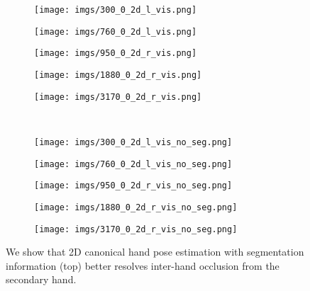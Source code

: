 \documentclass[10pt,twocolumn,letterpaper]{article}
\begin{document}
\begin{figure}[t]
  \centering
  \begin{subfigure}[t]{0.19\linewidth}
    \texttt{[image: imgs/300\_0\_2d\_l\_vis.png]}
  \end{subfigure}
  \begin{subfigure}[t]{0.19\linewidth}
    \texttt{[image: imgs/760\_0\_2d\_l\_vis.png]}
  \end{subfigure}
  \begin{subfigure}[t]{0.19\linewidth}
    \texttt{[image: imgs/950\_0\_2d\_r\_vis.png]}
  \end{subfigure}
  \begin{subfigure}[t]{0.19\linewidth}
    \texttt{[image: imgs/1880\_0\_2d\_r\_vis.png]}
  \end{subfigure}
  \begin{subfigure}[t]{0.19\linewidth}
    \texttt{[image: imgs/3170\_0\_2d\_r\_vis.png]}
  \end{subfigure}\\
  \begin{subfigure}[t]{0.19\linewidth}
    \texttt{[image: imgs/300\_0\_2d\_l\_vis\_no\_seg.png]}
  \end{subfigure}
  \begin{subfigure}[t]{0.19\linewidth}
    \texttt{[image: imgs/760\_0\_2d\_l\_vis\_no\_seg.png]}
  \end{subfigure}
  \begin{subfigure}[t]{0.19\linewidth}
    \texttt{[image: imgs/950\_0\_2d\_r\_vis\_no\_seg.png]}
  \end{subfigure}
  \begin{subfigure}[t]{0.19\linewidth}
    \texttt{[image: imgs/1880\_0\_2d\_r\_vis\_no\_seg.png]}
  \end{subfigure}
  \begin{subfigure}[t]{0.19\linewidth}
    \texttt{[image: imgs/3170\_0\_2d\_r\_vis\_no\_seg.png]}
  \end{subfigure}
  \caption{We show that 2D canonical hand pose estimation with segmentation information (top) better resolves inter-hand occlusion from the secondary hand.}
  \label{fig:seg_2d_demo_img}
\end{figure}
\end{document}
